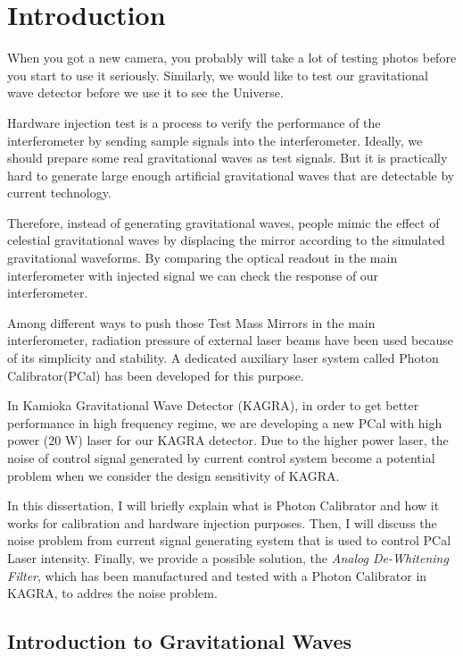 \chapter{Introduction} 

When you got a new camera, you probably will take a lot of testing photos before you start to use it seriously. Similarly, we would like to test our gravitational wave detector before we use it to see the Universe.

Hardware injection test is a process to verify the performance of the interferometer by sending sample signals into the interferometer\cite{ligo:inj}. Ideally, we should prepare some real gravitational waves as test signals. But it is practically hard to generate large enough artificial gravitational waves that are detectable by current technology. 

Therefore, instead of generating gravitational waves, people mimic the effect of celestial gravitational waves by displacing the mirror according to the simulated gravitational waveforms. By comparing the optical readout in the main interferometer with injected signal we can check the response of our interferometer. 

Among different ways to push those Test Mass Mirrors in the main interferometer, radiation pressure of external laser beams have been used because of its simplicity and stability. A dedicated auxiliary laser system called Photon Calibrator(PCal) has been developed for this purpose. 

In Kamioka Gravitational Wave Detector (KAGRA), in order to get better performance in high frequency regime, we are developing a new PCal with high power (20 W) laser for our KAGRA detector. Due to the higher power laser, the noise of control signal generated by current control system become a potential problem when we consider the design sensitivity of KAGRA.

In this dissertation, I will briefly explain what is Photon Calibrator and how it works for calibration and hardware injection purposes. Then, I will discuss the noise problem from current signal generating system that is used to control PCal Laser intensity. Finally, we provide a possible solution, the \emph{Analog De-Whitening Filter}, which has been manufactured and tested with a Photon Calibrator in KAGRA, to addres the noise problem. 
 

\section{Introduction to Gravitational Waves}
